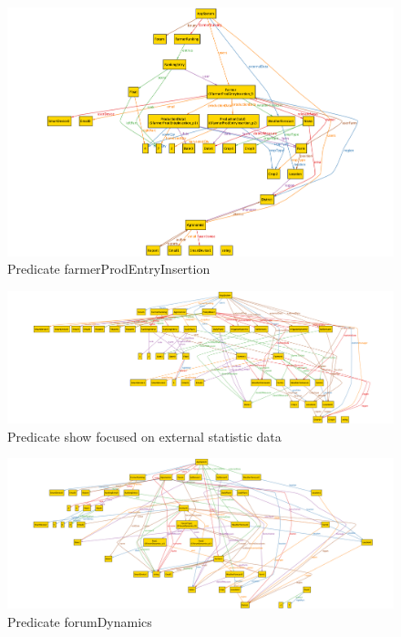 \documentclass[table, 12pt]{article}
\begin{document}
\begin{center}
    \begin{figure}[H]
        \includegraphics[scale=0.40, center]{assets/AlloyInstances/productionInsertion.png}
        \caption{Predicate farmerProdEntryInsertion}
        \label{fig: productionInsertion}
    \end{figure}
\end{center}

\begin{figure}
    \centering
    \includegraphics[scale=0.35, center]{assets/AlloyInstances/ExternalData.png}
    \caption{Predicate show focused on external statistic data}
    \label{fig: external data}
\end{figure}

\begin{figure}
    \centering
    \includegraphics[scale=0.35, center]{assets/AlloyInstances/forumDynamics.png}
    \caption{Predicate forumDynamics}
    \label{fig: forumDynamics}
\end{figure}
\end{document}
